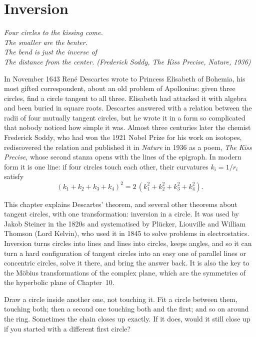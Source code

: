 \chapter{Inversion}\label{ch:inversion}

\begin{center}\itshape
Four circles to the kissing come.\\
The smaller are the benter.\\
The bend is just the inverse of\\
The distance from the center.
\upshape(Frederick Soddy, \emph{The Kiss Precise}, Nature, 1936)
\end{center}

In November 1643 Ren\'e Descartes wrote to Princess Elisabeth of Bohemia, his most gifted correspondent, about an old problem of
Apollonius: given three circles, find a circle tangent to all three. Elisabeth had attacked it with algebra and been buried in
square roots. Descartes answered with a relation between the radii of four mutually tangent circles, but he wrote it in a form so
complicated that nobody noticed how simple it was. Almost three centuries later the chemist Frederick Soddy, who had won the 1921 Nobel
Prize for his work on isotopes, rediscovered the relation and published it in \emph{Nature} in 1936 as a poem, \emph{The Kiss
Precise}, whose second stanza opens with the lines of the epigraph. In modern form it is one line: if four circles touch each other, their
curvatures $k_i=1/r_i$ satisfy
\[
(k_1+k_2+k_3+k_4)^2=2\,(k_1^2+k_2^2+k_3^2+k_4^2).
\]

This chapter explains Descartes' theorem, and several other theorems about tangent circles, with one transformation: inversion in a
circle. It was used by Jakob Steiner in the 1820s and systematised by Pl\"ucker, Liouville and William Thomson (Lord Kelvin), who used
it in 1845 to solve problems in electrostatics. Inversion turns circles into lines and lines into circles, keeps angles, and so it
can turn a hard configuration of tangent circles into an easy one of parallel lines or concentric circles, solve it there, and bring the
answer back. It is also the key to the M\"obius transformations of the complex plane, which are the symmetries of the hyperbolic plane of
Chapter~10.

\begin{think}
Draw a circle inside another one, not touching it. Fit a circle between them, touching both; then a second one touching both and the first;
and so on around the ring. Sometimes the chain closes up exactly. If it does, would it still close up if you started with a different first
circle?
\end{think}

